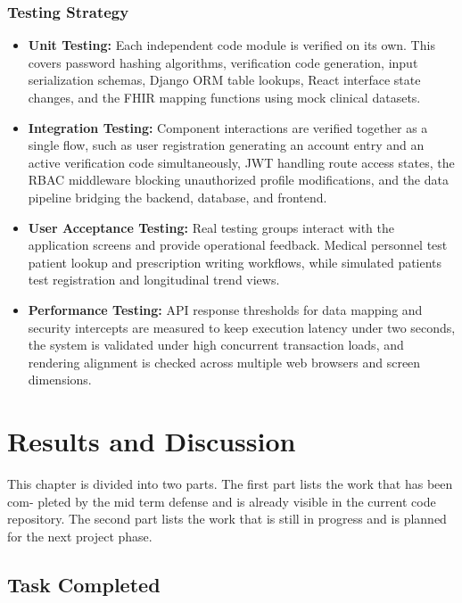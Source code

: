 \documentclass[12pt, a4paper]{report}
\numberwithin{equation}{chapter}
\begin{document}
\subsection{Testing Strategy}
\begin{itemize}
    \item \textbf{Unit Testing:} Each independent code module is verified on its own. This covers password hashing algorithms, verification code generation, input serialization schemas, Django ORM table lookups, React interface state changes, and the FHIR mapping functions using mock clinical datasets.
    \item \textbf{Integration Testing:} Component interactions are verified together as a single flow, such as user registration generating an account entry and an active verification code simultaneously, JWT handling route access states, the RBAC middleware blocking unauthorized profile modifications, and the data pipeline bridging the backend, database, and frontend.
    \item \textbf{User Acceptance Testing:} Real testing groups interact with the application screens and provide operational feedback. Medical personnel test patient lookup and prescription writing workflows, while simulated patients test registration and longitudinal trend views.
    \item \textbf{Performance Testing:} API response thresholds for data mapping and security intercepts are measured to keep execution latency under two seconds, the system is validated under high concurrent transaction loads, and rendering alignment is checked across multiple web browsers and screen dimensions.
\end{itemize}
\chapter{Results and Discussion}

This chapter is divided into two parts. The first part lists the work that has been com-
pleted by the mid term defense and is already visible in the current code repository. The
second part lists the work that is still in progress and is planned for the next project
phase.

\section{Task Completed}
\end{document}
